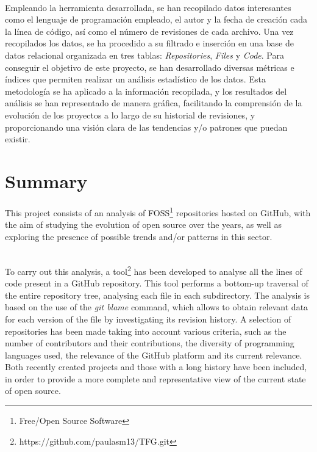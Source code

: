 \documentclass[a4paper, 12pt]{book}
\begin{document}
\\Empleando la herramienta desarrollada, se han recopilado datos interesantes como el lenguaje de programación empleado,
el autor y la fecha de creación cada la línea de código, así como el número de revisiones de cada archivo. Una vez recopilados los datos,
se ha procedido a su filtrado e inserción en una base de datos relacional organizada en tres tablas: \textit{Repositories}, \textit{Files}
y \textit{Code}. Para conseguir el objetivo de este proyecto, se han desarrollado diversas métricas e índices que permiten realizar un análisis
estadístico de los datos. Esta metodología se ha aplicado a la información recopilada, y los resultados del análisis se han representado de
manera gráfica, facilitando la comprensión de la evolución de los proyectos a lo largo de su historial de revisiones, y proporcionando una
visión clara de las tendencias y/o patrones que puedan existir.


\chapter*{Summary}

This project consists of an analysis of FOSS\footnote{Free/Open Source Software} repositories hosted on GitHub, with the aim of studying the
evolution of open source over the years, as well as exploring the presence of possible trends and/or patterns in this sector.

\\To carry out this analysis, a tool\footnote{https://github.com/paulasm13/TFG.git} has been developed to analyse all the lines of code present in a GitHub repository. This tool performs a
bottom-up traversal of the entire repository tree, analysing each file in each subdirectory. The analysis is based on the use of the \textit{git blame}
command, which allows to obtain relevant data for each version of the file by investigating its revision history. A selection of repositories
has been made taking into account various criteria, such as the number of contributors and their contributions, the diversity of programming
languages used, the relevance of the GitHub platform and its current relevance. Both recently created projects and those with a long history
have been included, in order to provide a more complete and representative view of the current state of open source.
\end{document}
